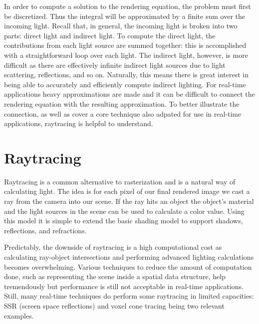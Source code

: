 In order to compute a solution to the rendering equation, the problem must first be discretized. Thus the integral will be approximated by a finite sum over the incoming light. Recall that, in general, the incoming light is broken into two parts: direct light and indirect light. To compute the direct light, the contributions from each light source are summed together: this is accomplished with a straightforward loop over each light. The indirect light, however, is more difficult as there are effectively infinite indirect light sources due to light scattering, reflections, and so on. Naturally, this means there is great interest in being able to accurately and efficiently compute indirect lighting. For real-time applications heavy approximations are made and it can be difficult to connect the rendering equation with the resulting approximation. To better illustrate the connection, as well as cover a core technique also adpated for use in real-time applications, raytracing is helpful to understand.


\section{Raytracing}
Raytracing is a common alternative to rasterization and is a natural way of calculating light. The idea is for each pixel of our final rendered image we cast a ray from the camera into our scene. If the ray hits an object the object's material and the light sources in the scene can be used to calculate a color value. Using this model it is simple to extend the basic shading model to support shadows, reflections, and refractions.

Predictably, the downside of raytracing is a high computational cost as calculating ray-object intersections and performing advanced lighting calculations becomes overwhelming. Various techniques to reduce the amount of computation done, such as representing the scene inside a spatial data structure, help tremendously but performance is still not acceptable in real-time applications. Still, many real-time techniques do perform some raytracing in limited capacities: SSR (screen space reflections) and voxel cone tracing being two relevant examples.

